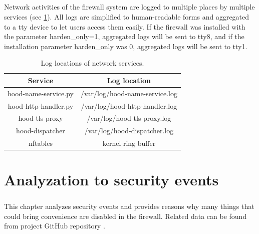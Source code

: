 \documentclass[mscthesis]{usiinfthesis}
\begin{document}
\paragraph{}
Network activities of the firewall system are logged to multiple places by multiple services (see \cref{tab:network_log}). All logs are simplified to human-readable forms and aggregated to a tty device to let users access them easily. If the firewall was installed with the parameter harden\_only=1, aggregated logs will be sent to tty8, and if the installation parameter harden\_only was 0, aggregated logs will be sent to tty1.
\begin{table}[H]
  \centering
  \begin{tabular}{|c|c|}
    \hline
    Service              & Log location                   \\
    \hline
    hood-name-service.py & /var/log/hood-name-service.log \\
    hood-http-handler.py & /var/log/hood-http-handler.log \\
    hood-tls-proxy       & /var/log/hood-tls-proxy.log    \\
    hood-dispatcher      & /var/log/hood-dispatcher.log   \\
    nftables             & kernel ring buffer             \\
    \hline
  \end{tabular}
  \caption{Log locations of network services.}
  \label{tab:network_log}
\end{table}



\chapter{Analyzation to security events}\label{cha:events}
\paragraph{}
This chapter analyzes security events and provides reasons why many things that could bring convenience are disabled in the firewall. Related data can be found from project GitHub repository \citep{hood:github}.
\end{document}
